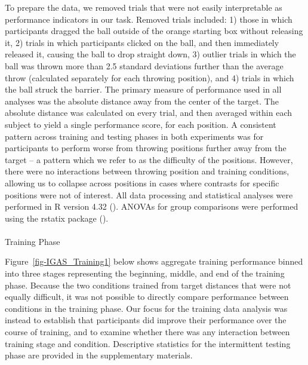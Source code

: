 \documentclass[
  11pt,
  letterpaper,
]{article}
\makeatletter
\let\oldparagraph\paragraph
\renewcommand{\paragraph}{
    \@ifstar
      \xxxParagraphStar
      \xxxParagraphNoStar
  }
\newcommand{\xxxParagraphStar}[1]{\oldparagraph*{#1}\mbox{}}
\newcommand{\xxxParagraphNoStar}[1]{\oldparagraph{#1}\mbox{}}
\makeatother
\begin{document}
To prepare the data, we removed trials that were not easily
interpretable as performance indicators in our task. Removed trials
included: 1) those in which participants dragged the ball outside of the
orange starting box without releasing it, 2) trials in which
participants clicked on the ball, and then immediately released it,
causing the ball to drop straight down, 3) outlier trials in which the
ball was thrown more than 2.5 standard deviations further than the
average throw (calculated separately for each throwing position), and 4)
trials in which the ball struck the barrier. The primary measure of
performance used in all analyses was the absolute distance away from the
center of the target. The absolute distance was calculated on every
trial, and then averaged within each subject to yield a single
performance score, for each position. A consistent pattern across
training and testing phases in both experiments was for participants to
perform worse from throwing positions further away from the target -- a
pattern which we refer to as the difficulty of the positions. However,
there were no interactions between throwing position and training
conditions, allowing us to collapse across positions in cases where
contrasts for specific positions were not of interest. All data
processing and statistical analyses were performed in R version 4.32
(). ANOVAs for group comparisons were performed using the rstatix
package
().

\paragraph{Training Phase}\label{training-phase}

Figure~\ref{fig-IGAS_Training1} below shows aggregate training
performance binned into three stages representing the beginning, middle,
and end of the training phase. Because the two conditions trained from
target distances that were not equally difficult, it was not possible to
directly compare performance between conditions in the training phase.
Our focus for the training data analysis was instead to establish that
participants did improve their performance over the course of training,
and to examine whether there was any interaction between training stage
and condition. Descriptive statistics for the intermittent testing phase
are provided in the supplementary materials.
\end{document}
